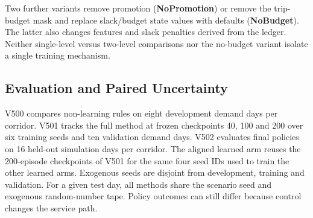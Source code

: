 Two further variants remove promotion (\textbf{NoPromotion}) or remove the trip-budget mask and replace slack/budget state values with defaults (\textbf{NoBudget}). The latter also changes features and slack penalties derived from the ledger. Neither single-level versus two-level comparisons nor the no-budget variant isolate a single training mechanism.

\begin{table}[t]
\centering
\caption{Key physical, estimator, and reinforcement learning hyperparameters (held fixed across all corridors).}
\label{tab:hyperparams}
\end{table}

\subsection{Evaluation and Paired Uncertainty}
\label{sec:setup_protocol}

V500 compares non-learning rules on eight development demand days per corridor. V501 tracks the full method at frozen checkpoints 40, 100 and 200 over six training seeds and ten validation demand days. V502 evaluates final policies on 16 held-out simulation days per corridor. The aligned learned arm reuses the 200-episode checkpoints of V501 for the same four seed IDs used to train the other learned arms. Exogenous seeds are disjoint from development, training and validation. For a given test day, all methods share the scenario seed and exogenous random-number tape. Policy outcomes can still differ because control changes the service path.

